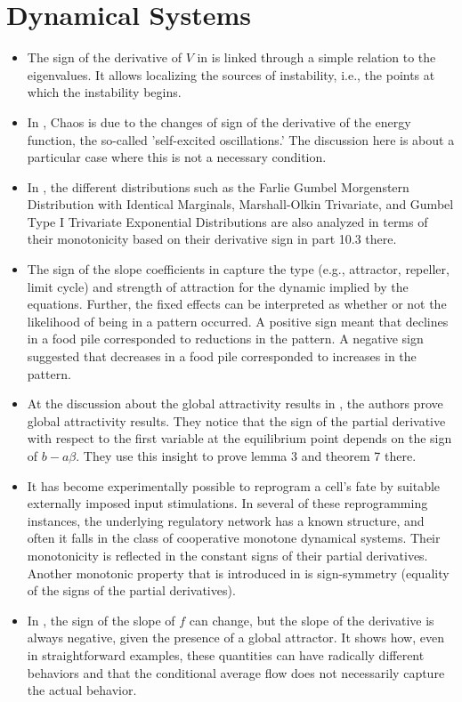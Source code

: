 \documentclass[11pt]{book}
\begin{document}
\section{Dynamical Systems}
\begin{itemize}
\item The sign of the derivative of $V$ in \cite{capone2005instability}
is linked through a simple relation to the eigenvalues. It allows
localizing the sources of instability, i.e., the points at which the
instability begins.
\item In \cite{solis2005chaos}, Chaos
is due to the changes of sign of the derivative of the energy function,
the so-called 'self-excited oscillations.' The discussion here is
about a particular case where this is not a necessary condition.
\item In \cite{yilmaz2015reliability},
the different distributions such as the Farlie Gumbel Morgenstern
Distribution with Identical Marginals, Marshall-Olkin Trivariate,
and Gumbel Type I Trivariate Exponential Distributions are also analyzed
in terms of their monotonicity based on their derivative sign in part
10.3 there.
\item The sign of the slope coefficients in \cite{butner2017modeling}
capture the type (e.g., attractor, repeller, limit cycle) and strength
of attraction for the dynamic implied by the equations. Further, the
fixed effects can be interpreted as whether or not the likelihood
of being in a pattern occurred. A positive sign meant that declines
in a food pile corresponded to reductions in the pattern. A negative
sign suggested that decreases in a food pile corresponded to increases
in the pattern.
\item At the discussion about the global attractivity results in \cite{kalabuvsic2018global},
the authors prove global attractivity results. They notice that the
sign of the partial derivative with respect to the first variable
at the equilibrium point depends on the sign of $b-a\beta$. They
use this insight to prove lemma 3 and theorem 7 there.
\item It has become experimentally possible to \textquotedbl reprogram\textquotedbl{}
a cell's fate by suitable externally imposed input stimulations. In
several of these reprogramming instances, the underlying regulatory
network has a known structure, and often it falls in the class of
cooperative monotone dynamical systems. Their monotonicity is reflected
in the constant signs of their partial derivatives. Another monotonic
property that is introduced in \cite{shah2018reprogramming}
is sign-symmetry (equality of the signs of the partial derivatives).
\item In \cite{aguilera2021particular},
the sign of the slope of $f$ can change, but the slope of the derivative
is always negative, given the presence of a global attractor. It shows
how, even in straightforward examples, these quantities can have radically
different behaviors and that the conditional average flow does not
necessarily capture the actual behavior.
\end{itemize}
\end{document}
